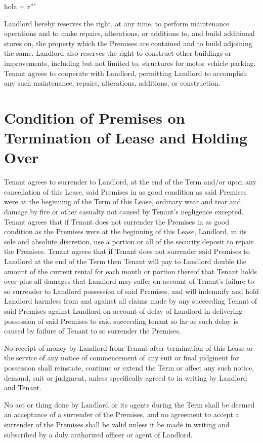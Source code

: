 hola = r'''\documentclass{article}
\begin{document}
    Landlord hereby reserves the right, at any time, to perform maintenance operations and to make repairs, alterations, or additions to, and build additional stores on, the property which the Premises are contained and to build adjoining the same.  Landlord also reserves the right to construct other buildings or improvements, including but not limited to, structures for motor vehicle parking.  Tenant agrees to cooperate with Landlord, permitting Landlord to accomplish any such maintenance, repairs, alterations, additions, or construction.  


\section{Condition of Premises on Termination of Lease and Holding Over}
    Tenant agrees to surrender to Landlord, at the end of the Term and/or upon any cancellation of this Lease, said Premises in as good condition as said Premises were at the beginning of the Term of this Lease, ordinary wear and tear and damage by fire or other casualty not caused by Tenant's negligence excepted.  Tenant agrees that if Tenant does not surrender the Premises in as good condition as the Premises were at the beginning of this Lease, Landlord, in its sole and absolute discretion, use a portion or all of the security deposit to repair the Premises.  Tenant agrees that if Tenant does not surrender said Premises to Landlord at the end of the Term then Tenant will pay to Landlord double the amount of the current rental for each month or portion thereof that Tenant holds over plus all damages that Landlord may suffer on account of Tenant's failure to so surrender to Landlord possession of said Premises, and will indemnify and hold Landlord harmless from and against all claims made by any succeeding Tenant of said Premises against Landlord on account of delay of Landlord in delivering possession of said Premises to said succeeding tenant so far as such delay is caused by failure of Tenant to so surrender the Premises.

    No receipt of money by Landlord from Tenant after termination of this Lease or the service of any notice of commencement of any suit or final judgment for possession shall reinstate, continue or extend the Term or affect any such notice, demand, suit or judgment, unless specifically agreed to in writing by Landlord and Tenant.

    No act or thing done by Landlord or its agents during the Term shall be deemed an acceptance of a surrender of the Premises, and no agreement to accept a surrender of the Premises shall be valid unless it be made in writing and subscribed by a duly authorized officer or agent of Landlord.
    
\end{document}
